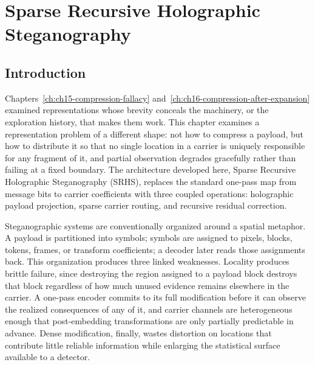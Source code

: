 
\chapter{Sparse Recursive Holographic Steganography}
\label{ch:ch17-sparse-holographic-steganography}
\section{Introduction}

Chapters~\ref{ch:ch15-compression-fallacy} and~\ref{ch:ch16-compression-after-expansion} examined representations whose brevity conceals the machinery, or the exploration history, that makes them work. This chapter examines a representation problem of a different shape: not how to compress a payload, but how to distribute it so that no single location in a carrier is uniquely responsible for any fragment of it, and partial observation degrades gracefully rather than failing at a fixed boundary. The architecture developed here, Sparse Recursive Holographic Steganography (SRHS), replaces the standard one-pass map from message bits to carrier coefficients with three coupled operations: holographic payload projection, sparse carrier routing, and recursive residual correction.

Steganographic systems are conventionally organized around a spatial metaphor. A payload is partitioned into symbols; symbols are assigned to pixels, blocks, tokens, frames, or transform coefficients; a decoder later reads those assignments back. This organization produces three linked weaknesses. Locality produces brittle failure, since destroying the region assigned to a payload block destroys that block regardless of how much unused evidence remains elsewhere in the carrier. A one-pass encoder commits to its full modification before it can observe the realized consequences of any of it, and carrier channels are heterogeneous enough that post-embedding transformations are only partially predictable in advance. Dense modification, finally, wastes distortion on locations that contribute little reliable information while enlarging the statistical surface available to a detector.

